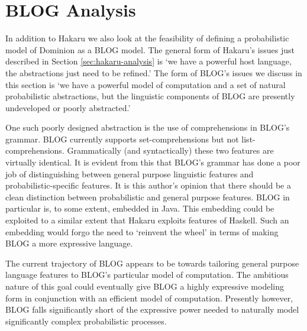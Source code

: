 \section{BLOG Analysis} \label{sec:blog-analysis}

In addition to Hakaru we also look at the feasibility of defining a
probabilistic model of Dominion as a BLOG model. The general form
of Hakaru's issues just described in Section \ref{sec:hakaru-analysis}
is `we have a powerful host language, the abstractions
just need to be refined.' The form of BLOG's issues we discuss in this
section is `we have a powerful model of computation and a set of
natural probabilistic abstractions, but the linguistic components
of BLOG are presently undeveloped or poorly abstracted.'

One such poorly designed abstraction is the use of comprehensions
in BLOG's grammar. BLOG currently supports set-comprehensions
but not list-comprehensions. Grammatically (and syntactically) these
two features are virtually identical.
It is evident from this that BLOG's grammar has done a poor job of
distinguishing between general purpose linguistic features and
probabilistic-specific features. It is this author's opinion that
there should be a clean distinction between probabilistic and
general purpose features. BLOG in particular is, to some extent, embedded
in Java. This embedding could be exploited to a similar extent that
Hakaru exploits features of Haskell. Such an embedding would forgo the
need to `reinvent the wheel' in terms of making BLOG a more expressive
language.

The current trajectory of BLOG appears to be towards tailoring
general purpose language features to BLOG's particular model of computation.
The ambitious nature of this goal could eventually give BLOG a highly
expressive modeling form in conjunction with an efficient model of
computation. Presently however, BLOG falls significantly short of the
expressive power needed to naturally model significantly complex
probabilistic processes.


